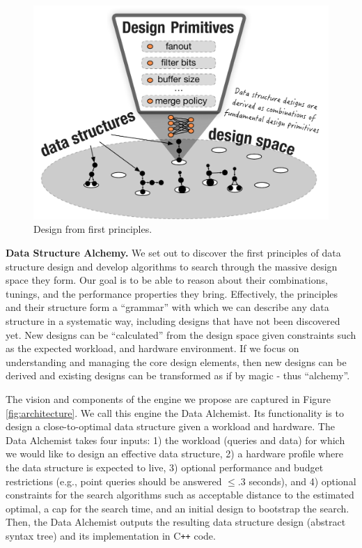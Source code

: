 \documentclass[11pt]{article}
\begin{document}
\begin{figure}
\vspace{-5ex}
\center
\includegraphics[width=.4\textwidth]{figs/IntroFigure2.pdf}
\vspace{-5ex}
\caption{Design from first principles.}
\vspace{-3ex}
\label{fig:concept}
\end{figure}
\textbf{Data Structure Alchemy.} We set out to discover the first principles of data structure design and develop algorithms to search through the massive design space they form. Our goal is to be able to reason about their combinations, tunings, and the performance properties they bring. Effectively, the principles and their structure form a ``grammar'' with which we can describe any data structure in a systematic way, including designs that have not been discovered yet. New designs can be ``calculated'' from the design space given constraints such as the expected workload, and hardware environment. If we focus on understanding and managing the core design elements, then new designs can be derived and existing designs can be transformed as if by magic - thus ``alchemy''.   

The vision and components of the engine we propose are captured in Figure \ref{fig:architecture}. We call this engine the Data Alchemist. Its functionality is to design a close-to-optimal data structure given a workload and hardware. The Data Alchemist takes four inputs: 1) the workload (queries and data) for which we would like to design an effective data structure, 2) a hardware profile where the data structure is expected to live, 3) optional performance and budget restrictions (e.g., point queries should be answered $\leq .3$ seconds), and 4) optional constraints for the search algorithms such as acceptable distance to the estimated optimal, a cap for the search time, and an initial design to bootstrap the search. 
Then, the Data Alchemist outputs the resulting data structure design (abstract syntax tree) and its implementation in C\texttt{++} code. 
\end{document}
